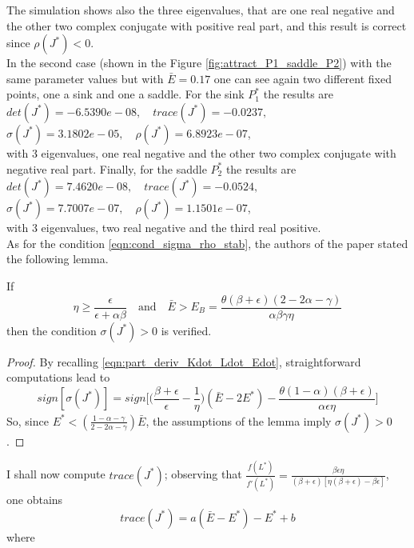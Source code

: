 The simulation shows also the three eigenvalues, that are one real negative and the other two complex conjugate with positive real part, and this result is correct since $\rho(J^*)<0$.\\
In the second case (shown in the Figure \ref{fig:attract_P1_saddle_P2}) with the same parameter values but with $\bar{E}=0.17$ one can see again two different fixed points, one a sink and one a saddle. For the sink $P_1^*$ the results are\\ $det(J^*)=-6.5390e-08,\quad trace(J^*)=-0.0237,$\\ $\sigma(J^*)=3.1802e-05,\quad \rho(J^*)=6.8923e-07$,\\ 
with 3 eigenvalues, one real negative and the other two complex conjugate with negative real part. Finally, for the saddle $P_2^*$ the results are\\ $det(J^*)=7.4620e-08,\quad trace(J^*)=-0.0524,$\\ $\sigma(J^*)=7.7007e-07,\quad \rho(J^*)=1.1501e-07$,\\ 
with 3 eigenvalues, two real negative and the third real positive. \\
As for the condition \eqref{eqn:cond_sigma_rho_stab}, the authors of the paper stated the following lemma.
\begin{lemma} \label{lemma:3_condition_for_simga_pos}
	If 
	\begin{equation} \label{eqn:lemma_3}
		\eta\geq \frac{\epsilon}{\epsilon+\alpha\beta} \quad \text{and} \quad \bar{E}>E_B=\frac{\theta(\beta+\epsilon)(2-2\alpha-\gamma)}{\alpha\beta\gamma\eta}
	\end{equation}
	then the condition $\sigma(J^*)>0$ is verified.
\end{lemma}
\begin{proof}
	By recalling \eqref{eqn:part_deriv_Kdot_Ldot_Edot}, straightforward computations lead to 
	$$ sign[\sigma(J^*)] = sign\Bigg[\Bigg(\frac{\beta+\epsilon}{\epsilon}-\frac{1}{\eta}\Bigg)(\bar{E}-2E^*)-\frac{\theta(1-\alpha)(\beta+\epsilon)}{\alpha\epsilon\eta}\Bigg] $$
	So, since $E^*<(\frac{1-\alpha-\gamma}{2-2\alpha-\gamma})\bar{E}$, the assumptions of the lemma imply $\sigma(J^*)>0$.
\end{proof}
I shall now compute $trace(J^*)$; observing that $\frac{f(L^*)}{f'(L^*)}=\frac{\beta\epsilon\eta}{(\beta+\epsilon)[\eta(\beta+\epsilon)-\beta\epsilon]}$, one obtains $$trace(J^*)=a(\bar{E}-E^*)-E^*+b$$ where 

